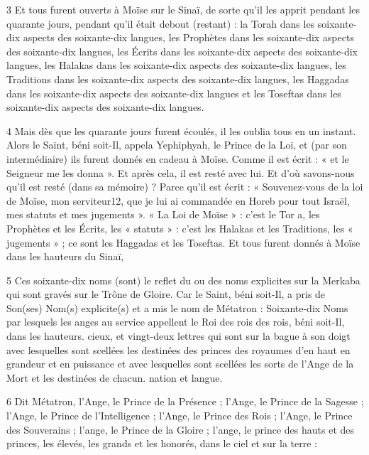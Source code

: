 \par 3 Et tous furent ouverts à Moïse sur le Sinaï, de sorte qu'il les apprit pendant les quarante jours, pendant qu'il était debout (restant) : la Torah dans les soixante-dix aspects des soixante-dix langues, les Prophètes dans les soixante-dix aspects des soixante-dix langues, les Écrits dans les soixante-dix aspects des soixante-dix langues, les Halakas dans les soixante-dix aspects des soixante-dix langues, les Traditions dans les soixante-dix aspects des soixante-dix langues, les Haggadas dans les soixante-dix aspects des soixante-dix langues et les Toseftas dans les soixante-dix aspects des soixante-dix langues.

\par 4 Mais dès que les quarante jours furent écoulés, il les oublia tous en un instant. Alors le Saint, béni soit-Il, appela Yephiphyah, le Prince de la Loi, et (par son intermédiaire) ils furent donnés en cadeau à Moïse. Comme il est écrit : « et le Seigneur me les donna ». Et après cela, il est resté avec lui. Et d'où savons-nous qu'il est resté (dans sa mémoire) ? Parce qu'il est écrit : « Souvenez-vous de la loi de Moïse, mon serviteur12, que je lui ai commandée en Horeb pour tout Israël, mes statuts et mes jugements ». « La Loi de Moïse » : c'est le Tor a, les Prophètes et les Écrits, les « statuts » : c'est les Halakas et les Traditions, les « jugements » ; ce sont les Haggadas et les Toseftas. Et tous furent donnés à Moïse dans les hauteurs du Sinaï,

\par 5 Ces soixante-dix noms (sont) le reflet du ou des noms explicites sur la Merkaba qui sont gravés sur le Trône de Gloire. Car le Saint, béni soit-Il, a pris de Son(ses) Nom(s) explicite(s) et a mis le nom de Métatron : Soixante-dix Noms par lesquels les anges au service appellent le Roi des rois des rois, béni soit-Il, dans les hauteurs. cieux, et vingt-deux lettres qui sont sur la bague à son doigt avec lesquelles sont scellées les destinées des princes des royaumes d'en haut en grandeur et en puissance et avec lesquelles sont scellées les sorts de l'Ange de la Mort et les destinées de chacun. nation et langue.

\par 6 Dit Métatron, l'Ange, le Prince de la Présence ; l'Ange, le Prince de la Sagesse ; l'Ange, le Prince de l'Intelligence ; l'Ange, le Prince des Rois ; l'Ange, le Prince des Souverains ; l'ange, le Prince de la Gloire ; l'ange, le prince des hauts et des princes, les élevés, les grands et les honorés, dans le ciel et sur la terre :

